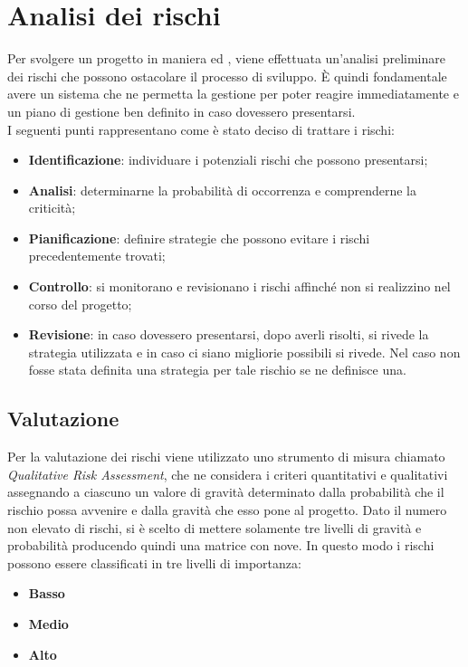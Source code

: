 
\newpage
\section{Analisi dei rischi} \label{AnalisiDeiRischi}
	Per svolgere un progetto in maniera  ed , viene effettuata un'analisi preliminare dei rischi che possono ostacolare il processo di sviluppo.
	È quindi fondamentale avere un sistema che ne permetta la gestione per poter reagire immediatamente e un piano di gestione ben definito in caso dovessero presentarsi.\\
	I seguenti punti rappresentano come è stato deciso di trattare i rischi:
	\begin{itemize}
		\item \textbf{Identificazione}: individuare i potenziali rischi che possono presentarsi;
		\item \textbf{Analisi}: determinarne la probabilità di occorrenza e comprenderne la criticità;
		\item \textbf{Pianificazione}: definire strategie che possono evitare i rischi precedentemente trovati;
		\item \textbf{Controllo}: si monitorano e revisionano i rischi affinché non si realizzino nel corso del progetto;
		\item \textbf{Revisione}: in caso dovessero presentarsi, dopo averli risolti, si rivede la strategia utilizzata e in caso ci siano migliorie possibili si rivede. Nel caso non fosse stata definita una strategia per tale rischio se ne definisce una.
	\end{itemize}
	\subsection{Valutazione}
	Per la valutazione dei rischi viene utilizzato uno strumento di misura chiamato \textit{Qualitative Risk Assessment}, che ne considera i criteri quantitativi e qualitativi assegnando a ciascuno un valore di gravità determinato dalla probabilità che il rischio possa avvenire e dalla gravità che esso pone al progetto.
	Dato il numero non elevato di rischi, si è scelto di mettere solamente tre livelli di gravità e probabilità producendo quindi una matrice con nove. In questo modo i rischi possono essere classificati in tre livelli di importanza:
	
	\begin{itemize}
		\item \textbf{Basso}
		\item \textbf{Medio}
		\item \textbf{Alto}
	\end{itemize}

